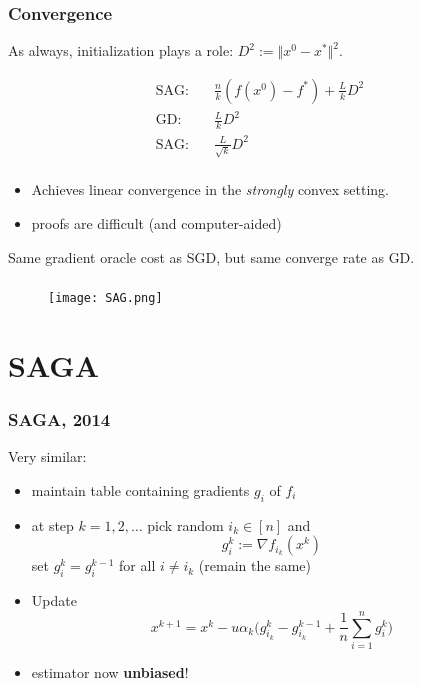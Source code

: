 \documentclass{beamer}
\begin{document}
\begin{frame}
  \frametitle{Convergence}
  As always, initialization plays a role: $D^2 := \Vert x^0 -x^* \Vert^2$.

  \begin{equation}
    \begin{aligned}
      \text{SAG:}& \quad \frac{n}{k}(f(x^0)-f^*) + \frac{L}{k}D^2 \\
      \text{GD:}& \quad \frac{L}{k}D^2 \\
      \text{SAG:}& \quad \frac{L}{\sqrt{k}}D^2 \\
    \end{aligned}
  \end{equation}
  \begin{itemize}
    \item Achieves linear convergence in the \emph{strongly} convex setting.
    \item proofs are difficult (and computer-aided)
  \end{itemize}


  \begin{center}
    Same gradient oracle cost as SGD, but same converge rate as GD.
  \end{center}
\end{frame}

\begin{frame}
  \frametitle{}
  \begin{figure}[ht]
    \centering
    \texttt{[image: SAG.png]}
    \caption{\label{fig:label} }
  \end{figure}


\end{frame}

\section{SAGA}%
\label{sec:}

\begin{frame}
  \frametitle{SAGA, 2014}
  Very similar:
  \begin{itemize}
    \item maintain table containing gradients $g_i$ of $f_i$
    \item at step $k = 1,2, \dots$ pick random $i_k \in [n]$ and
          \begin{equation}
            g_i^k := \nabla f_{i_k}(x^{k})
          \end{equation}
          set $g_{i}^k = g_i^{k-1}$ for all $i\neq i_k$ (remain the same)
    \item Update
          \begin{equation}
            x^{k+1} = x^k -u \alpha_k  \Big( g_{i_k}^k - g_{i_k}^{k-1} + \frac{1}{n}\sum_{i=1}^{n} g_i^k \Big)
          \end{equation}
    \item estimator now \textbf{unbiased}!
  \end{itemize}
\end{frame}
\end{document}
